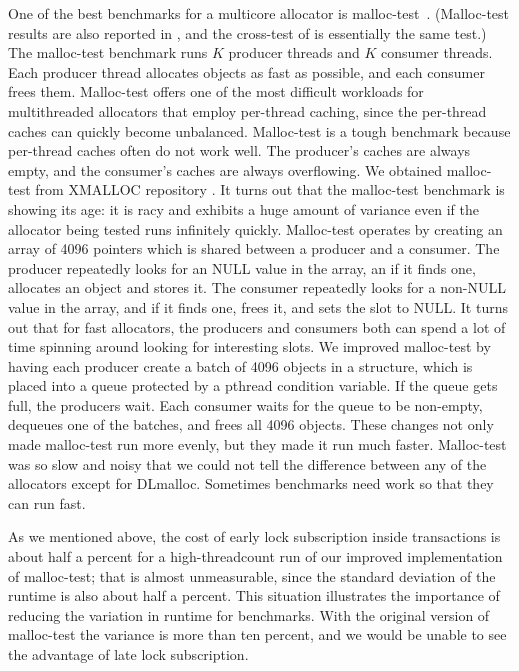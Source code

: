 \documentclass{sigplanconf}
\begin{document}
One of the best benchmarks for a multicore allocator is
malloc-test~\cite{LeverBo00}.  (Malloc-test results are also reported
in \cite{Evans06}, and the cross-test of \cite{KukanovVo07} is
essentially the same test.)  The malloc-test benchmark runs $K$
producer threads and $K$ consumer threads.  Each producer thread
allocates objects as fast as possible, and each consumer frees them.
Malloc-test offers one of the most difficult workloads for
multithreaded allocators that employ per-thread caching, since the
per-thread caches can quickly become unbalanced.  Malloc-test is a
tough benchmark because per-thread caches often do not work well.  The
producer's caches are always empty, and the consumer's caches are
always overflowing.  We obtained malloc-test from XMALLOC repository
\cite{EderSc12}.  It turns out that the malloc-test benchmark is
showing its age: it is racy and exhibits a huge amount of variance
even if the allocator being tested runs infinitely quickly.
Malloc-test operates by creating an array of 4096 pointers which is
shared between a producer and a consumer.  The producer repeatedly
looks for an NULL value in the array, an if it finds one, allocates an
object and stores it.  The consumer repeatedly looks for a non-NULL
value in the array, and if it finds one, frees it, and sets the slot
to NULL\@.  It turns out that for fast allocators, the producers and
consumers both can spend a lot of time spinning around looking for
interesting slots.  We improved malloc-test by having each producer
create a batch of 4096 objects in a structure, which is placed into a
queue protected by a pthread condition variable.  If the queue gets
full, the producers wait.  Each consumer waits for the queue to be
non-empty, dequeues one of the batches, and frees all 4096 objects.
These changes not only made malloc-test run more evenly, but they made
it run much faster.  Malloc-test was so slow and noisy that we could
not tell the difference between any of the allocators except for
DLmalloc.  Sometimes benchmarks need work so that they can run fast.

As we mentioned above, the cost of early lock subscription inside
transactions is about half a percent for a high-threadcount run of our
improved implementation of malloc-test; that is almost unmeasurable,
since the standard deviation of the runtime is also about half a
percent.  This situation illustrates the importance of reducing the
variation in runtime for benchmarks.  With the original version of
malloc-test the variance is more than ten percent, and we would be
unable to see the advantage of late lock subscription.
\end{document}
